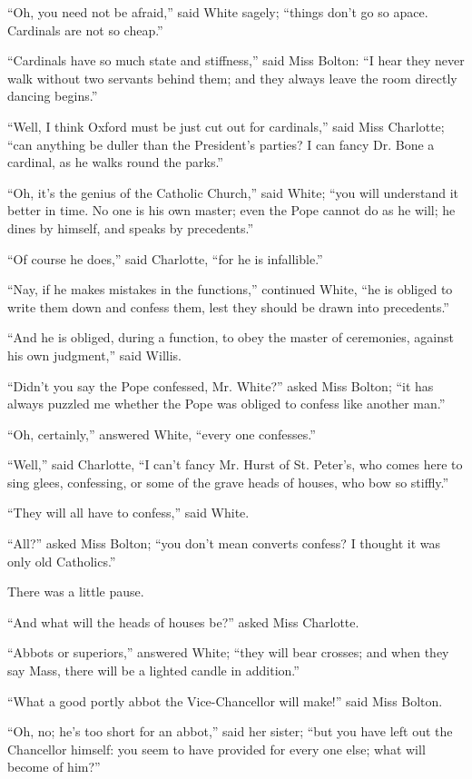 ``Oh, you need not be afraid,'' said White sagely;
``things don't go so apace. Cardinals are not so cheap.''

``Cardinals have so much state and stiffness,'' said Miss
Bolton: ``I hear they never walk without two servants behind
them; and they always leave the room directly dancing begins.''

``Well, I think Oxford must be just cut out for
cardinals,'' said Miss Charlotte; ``can anything be duller
than the President's parties? I can fancy Dr. Bone a cardinal, as he
walks round the parks.''

``Oh, it's the genius of the Catholic Church,'' said White;
``you will understand it better in time. No one is his own master;
even the Pope cannot do as he will; he dines by himself, and speaks by
precedents.''

``Of course he does,'' said Charlotte, ``for he is
infallible.''

``Nay, if he makes mistakes in the functions,'' continued
White, ``he is obliged to write them down and confess them, lest
they should be drawn into precedents.''

``And he is obliged, during a function, to obey the master of
ceremonies, against his own judgment,'' said Willis.

``Didn't you say the Pope confessed, Mr. White?'' asked
Miss Bolton; ``it has always puzzled me whether the Pope was
obliged to confess like another man.''

``Oh, certainly,'' answered White, ``every one
confesses.''

``Well,'' said Charlotte, ``I can't fancy Mr. Hurst of
St. Peter's, who comes here to sing glees, confessing, or some of the
grave heads of houses, who bow so stiffly.''

``They will all have to confess,'' said White.

``All?'' asked Miss Bolton; ``you don't mean converts
confess? I thought it was only old Catholics.''

There was a little pause.

``And what will the heads of houses be?'' asked Miss
Charlotte.

``Abbots or superiors,'' answered White; ``they will
bear crosses; and when they say Mass, there will be a lighted candle
in addition.''

``What a good portly abbot the Vice-Chancellor will make!''
said Miss Bolton.

``Oh, no; he's too short for an abbot,'' said her sister;
``but you have left out the Chancellor himself: you seem to have
provided for every one else; what will become of him?''

